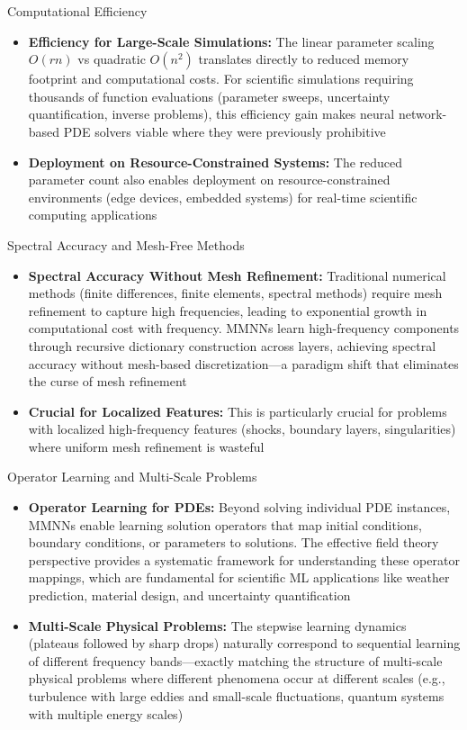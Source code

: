 \documentclass[aspectratio=169]{beamer}
\begin{document}
\begin{frame}{Computational Efficiency}
\begin{itemize}
\item \textbf{Efficiency for Large-Scale Simulations:} The linear parameter scaling $O(rn)$ vs quadratic $O(n^2)$ translates directly to reduced memory footprint and computational costs. For scientific simulations requiring thousands of function evaluations (parameter sweeps, uncertainty quantification, inverse problems), this efficiency gain makes neural network-based PDE solvers viable where they were previously prohibitive
\item \textbf{Deployment on Resource-Constrained Systems:} The reduced parameter count also enables deployment on resource-constrained environments (edge devices, embedded systems) for real-time scientific computing applications
\end{itemize}
\end{frame}

\begin{frame}{Spectral Accuracy and Mesh-Free Methods}
\begin{itemize}
\item \textbf{Spectral Accuracy Without Mesh Refinement:} Traditional numerical methods (finite differences, finite elements, spectral methods) require mesh refinement to capture high frequencies, leading to exponential growth in computational cost with frequency. MMNNs learn high-frequency components through recursive dictionary construction across layers, achieving spectral accuracy without mesh-based discretization—a paradigm shift that eliminates the curse of mesh refinement
\item \textbf{Crucial for Localized Features:} This is particularly crucial for problems with localized high-frequency features (shocks, boundary layers, singularities) where uniform mesh refinement is wasteful
\end{itemize}
\end{frame}

\begin{frame}{Operator Learning and Multi-Scale Problems}
\begin{itemize}
\item \textbf{Operator Learning for PDEs:} Beyond solving individual PDE instances, MMNNs enable learning solution operators that map initial conditions, boundary conditions, or parameters to solutions. The effective field theory perspective provides a systematic framework for understanding these operator mappings, which are fundamental for scientific ML applications like weather prediction, material design, and uncertainty quantification
\item \textbf{Multi-Scale Physical Problems:} The stepwise learning dynamics (plateaus followed by sharp drops) naturally correspond to sequential learning of different frequency bands—exactly matching the structure of multi-scale physical problems where different phenomena occur at different scales (e.g., turbulence with large eddies and small-scale fluctuations, quantum systems with multiple energy scales)
\end{itemize}
\end{frame}
\end{document}
